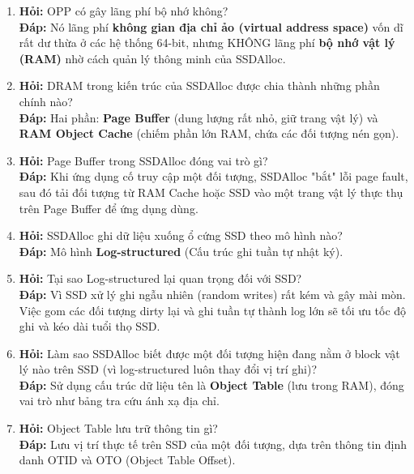 \documentclass[12pt,a4paper]{article}
\begin{document}
\begin{enumerate}
    \item \textbf{Hỏi:} OPP có gây lãng phí bộ nhớ không? \\
    \textbf{Đáp:} Nó lãng phí \textbf{không gian địa chỉ ảo (virtual address space)} vốn dĩ rất dư thừa ở các hệ thống 64-bit, nhưng KHÔNG lãng phí \textbf{bộ nhớ vật lý (RAM)} nhờ cách quản lý thông minh của SSDAlloc.
    
    \item \textbf{Hỏi:} DRAM trong kiến trúc của SSDAlloc được chia thành những phần chính nào? \\
    \textbf{Đáp:} Hai phần: \textbf{Page Buffer} (dung lượng rất nhỏ, giữ trang vật lý) và \textbf{RAM Object Cache} (chiếm phần lớn RAM, chứa các đối tượng nén gọn).
    
    \item \textbf{Hỏi:} Page Buffer trong SSDAlloc đóng vai trò gì? \\
    \textbf{Đáp:} Khi ứng dụng cố truy cập một đối tượng, SSDAlloc "bắt" lỗi page fault, sau đó tải đối tượng từ RAM Cache hoặc SSD vào một trang vật lý thực thụ trên Page Buffer để ứng dụng dùng.
    
    \item \textbf{Hỏi:} SSDAlloc ghi dữ liệu xuống ổ cứng SSD theo mô hình nào? \\
    \textbf{Đáp:} Mô hình \textbf{Log-structured} (Cấu trúc ghi tuần tự nhật ký).
    
    \item \textbf{Hỏi:} Tại sao Log-structured lại quan trọng đối với SSD? \\
    \textbf{Đáp:} Vì SSD xử lý ghi ngẫu nhiên (random writes) rất kém và gây mài mòn. Việc gom các đối tượng dirty lại và ghi tuần tự thành log lớn sẽ tối ưu tốc độ ghi và kéo dài tuổi thọ SSD.
    
    \item \textbf{Hỏi:} Làm sao SSDAlloc biết được một đối tượng hiện đang nằm ở block vật lý nào trên SSD (vì log-structured luôn thay đổi vị trí ghi)? \\
    \textbf{Đáp:} Sử dụng cấu trúc dữ liệu tên là \textbf{Object Table} (lưu trong RAM), đóng vai trò như bảng tra cứu ánh xạ địa chỉ.
    
    \item \textbf{Hỏi:} Object Table lưu trữ thông tin gì? \\
    \textbf{Đáp:} Lưu vị trí thực tế trên SSD của một đối tượng, dựa trên thông tin định danh OTID và OTO (Object Table Offset).
    

\end{enumerate}
\end{document}
